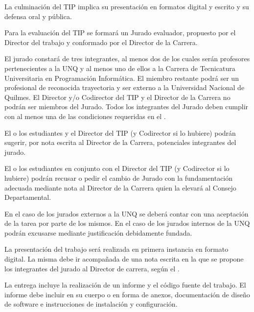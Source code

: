 
\articulo La culminación del TIP implica su presentación en formatos digital y
 escrito y su defensa oral y pública.

\articulo Para la evaluación del TIP se formará
un Jurado evaluador, propuesto por el Director del trabajo y conformado por el
Director de la Carrera.

\articulo El jurado constará de tres integrantes, al menos dos de los cuales
serán profesores pertenecientes a la UNQ y al menos uno de ellos a la Carrera de
Tecnicatura Universitaria en Programación Informática. El miembro restante podrá ser
un profesional de reconocida trayectoria y ser externo a la Universidad Nacional de
Quilmes. El Director y/o Codirector del TIP y el Director de la Carrera no podrán ser
miembros del Jurado. Todos los integrantes del Jurado deben cumplir con al menos
una de las condiciones requeridas en el \artCondDirector.

\articulo El o los estudiantes y el Director del TIP (y Codirector si lo
hubiere) podrán sugerir, por nota escrita al Director de la Carrera, potenciales
integrantes del jurado.

\articulo El o los estudiantes en conjunto con el Director del TIP (y
Codirector si lo hubiere) podrán recusar o pedir el cambio de Jurado con la
fundamentación adecuada mediante nota al Director de la Carrera quien la elevará al
Consejo Departamental.

\articulo En el caso de los jurados externos a la UNQ se deberá contar
con una aceptación de la tarea por parte de los mismos. En el caso de los jurados
internos de la UNQ podrán excusarse mediante justificación debidamente fundada. 


\articulo La presentación del trabajo será realizada en primera instancia en
formato digital. La misma debe ir acompañada de una nota escrita en la que se
propone los integrantes del jurado al Director de carrera, según el
\anexoEntregaDigitalTIP.

\articulo La entrega incluye la realización de un informe y el código fuente del
trabajo. El informe debe incluir en su cuerpo o en forma de anexos,
documentación de diseño de software e instrucciones de instalación y
configuración.

